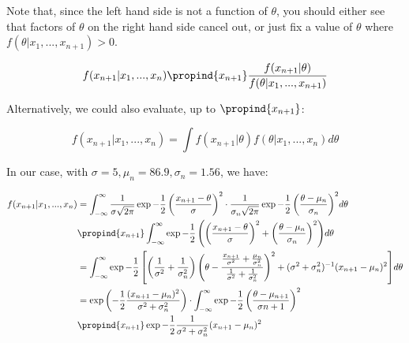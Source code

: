 \documentclass[a4paper]{article}
\begin{document}
                Note that, since the left hand side is not a function of
                $\theta$, you should either see that factors of $\theta$ on the
                right hand side cancel out, or just fix a value of $\theta$
                where $f(\theta | x_1, ..., x_{n + 1}) > 0$.

                \[
                    f(x_{n+1} | x_1, ..., x_n) \propind{x_{n+1}}
                        \frac{f(x_{n+1} | \theta)}{f(\theta |x_1, ..., x_{n+1})}
                \]

                Alternatively, we could also evaluate, up to
                $\propind{x_{n+1}}$:

                $$
                    f(x_{n+1}|x_1, ..., x_n) = \int f(x_{n+1}|\theta)f(\theta|
                    x_1, ..., x_n) d\theta
                $$

                In our case, with $\sigma = 5, \mu_n = 86.9, \sigma_n = 1.56$,
                we have:

                \begin{align*}
                    f(x_{n + 1} | x_1, ..., x_n) & = \int_{-\infty}^\infty
                        \frac{1}{\sigma\sqrt{2\pi}} \exp{-\frac{1}{2}\left(
                        \frac{x_{n+1} - \theta}{\sigma}\right)^2} \cdot
                        \frac{1}{\sigma_n\sqrt{2\pi}} \exp{-\frac{1}{2}\left(
                        \frac{\theta - \mu_n}{\sigma_n}\right)^2} d\theta \\
                    & \propind{x_{n+1}} \int_{-\infty}^\infty \exp{-\frac{1}{2}
                        \left(\left(\frac{x_{n+1} - \theta}{\sigma}\right)^2 +
                        \left(\frac{\theta - \mu_n}{\sigma_n}\right)^2\right)}
                        d\theta \\
                    & = \int_{-\infty}^\infty \exp{-\frac{1}{2}\left[\left(
                        \frac{1}{\sigma^2} + \frac{1}{\sigma_n^2}\right)\left(
                        \theta - \frac{\frac{x_{n+1}}{\sigma^2} +
                        \frac{\mu_n}{\sigma_n^2}}{\frac{1}{\sigma^2} +
                        \frac{1}{\sigma_n^2}}\right)^2 + (\sigma^2 +
                        \sigma_n^2)^{-1}(x_{n+1} - \mu_n)^2\right]} d\theta \\
                    & = \exp{\left(-\frac{1}{2}\frac{(x_{n+1} - \mu_n)^2}{
                        \sigma^2 + \sigma_n^2}\right)} \cdot \int_{-\infty}
                        ^\infty \exp{-\frac{1}{2}\left(\frac{\theta - \mu_{n+1}}
                        {\sigma{n+1}}\right)^2} \\
                    & \propind{x_{n + 1}} \exp{-\frac{1}{2} \frac{1}{\sigma^2 +
                        \sigma_n^2} (x_{n+1} - \mu_n)^2}
                \end{align*}
\end{document}
